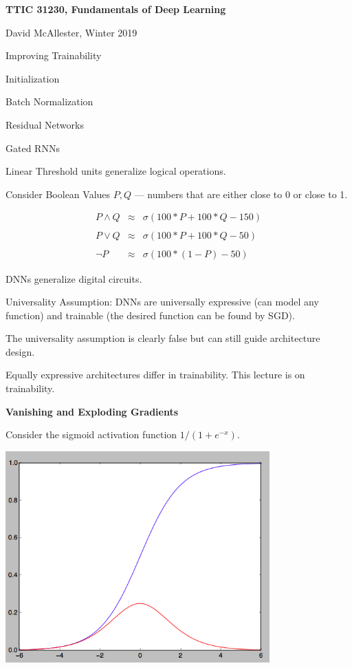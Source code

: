 




{\Huge

  \centerline{\bf TTIC 31230, Fundamentals of Deep Learning}
  \bigskip
  \centerline{David McAllester, Winter 2019}
  \vfill
  \centerline{Improving Trainability}
  \vfill
  \vfill
  \centerline{Initialization}
  \vfill
  \centerline{Batch Normalization}
  \vfill
  \centerline{Residual Networks}
  \vfill
  \centerline{Gated RNNs}


Linear Threshold units generalize logical operations.

\vfill
Consider Boolean Values $P,Q$ --- numbers that are either close to 0 or close to 1.

\vfill
\begin{eqnarray*}
P \wedge Q & \approx & \sigma(100*P + 100* Q -150) \\
\\
P \vee Q & \approx & \sigma(100*P + 100* Q -50) \\
\\
\neg P & \approx & \sigma(100*(1-P) - 50)
\end{eqnarray*}

\vfill
DNNs generalize digital circuits.


{\color{red} Universality Assumption:} DNNs are universally expressive (can model any function) and trainable (the desired function can be found by SGD).

\vfill
The universality assumption is clearly false but can still guide architecture design.

\vfill
Equally expressive architectures differ in trainability.  This lecture is on trainability.

\slide{}

\centerline{\bf Vanishing and Exploding Gradients}
\vfill
\vfill


Consider the sigmoid activation function $1/(1+ e^{-x})$.

\vfill
\centerline{\includegraphics[width= 4.0in]{../images/sigmoid2}}


}
